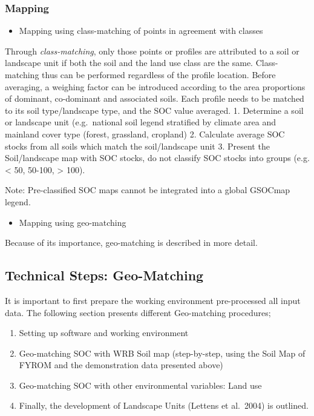 \documentclass[10pt,b5paper,]{book}
\providecommand{\tightlist}{%
  \setlength{\itemsep}{0pt}\setlength{\parskip}{0pt}}
\theoremstyle{definition}
\theoremstyle{definition}
\theoremstyle{definition}
\theoremstyle{remark}
\begin{document}
\hypertarget{mapping}{%
\subsubsection{Mapping}\label{mapping}}

\begin{itemize}
\tightlist
\item
  Mapping using class-matching of points in agreement with classes
\end{itemize}

Through \emph{class-matching}, only those points or profiles are
attributed to a soil or landscape unit if both the soil and the land use
class are the same. Class-matching thus can be performed regardless of
the profile location. Before averaging, a weighing factor can be
introduced according to the area proportions of dominant, co-dominant
and associated soils. Each profile needs to be matched to its soil
type/landscape type, and the SOC value averaged. 1. Determine a soil or
landscape unit (e.g.~national soil legend stratified by climate area and
mainland cover type (forest, grassland, cropland) 2. Calculate average
SOC stocks from all soils which match the soil/landscape unit 3. Present
the Soil/landscape map with SOC stocks, do not classify SOC stocks into
groups (e.g. \textless{} 50, 50-100, \textgreater{} 100).

Note: Pre-classified SOC maps cannot be integrated into a global GSOCmap
legend.

\begin{itemize}
\tightlist
\item
  Mapping using geo-matching
\end{itemize}

Because of its importance, geo-matching is described in more detail.

\hypertarget{technical-steps-geo-matching}{%
\subsection{Technical Steps:
Geo-Matching}\label{technical-steps-geo-matching}}

It is important to first prepare the working environment pre-processed
all input data. The following section presents different Geo-matching
procedures;

\begin{enumerate}
\def\labelenumi{\arabic{enumi}.}
\tightlist
\item
  Setting up software and working environment
\item
  Geo-matching SOC with WRB Soil map (step-by-step, using the Soil Map
  of FYROM and the demonstration data presented above)
\item
  Geo-matching SOC with other environmental variables: Land use
\item
  Finally, the development of Landscape Units (Lettens et al.~2004) is
  outlined.
\end{enumerate}
\end{document}
